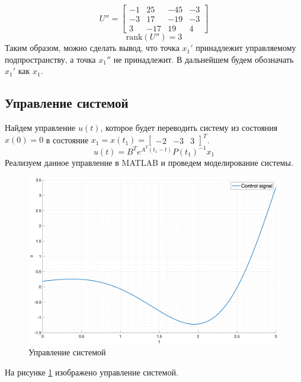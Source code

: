 \begin{equation}
   U'' = \begin{bmatrix}
        -1 & 25 & -45 & -3 \\
        -3 & 17 & -19 & -3 \\
        3 & -17 & 19 & 4
    \end{bmatrix}
\end{equation}
\begin{equation}
    \text{rank}(U'') = 3
\end{equation}
Таким образом, можно сделать вывод, что точка $x_1'$ принадлежит управляемому подпространству, а точка $x_1''$ не принадлежит. В дальнейшем будем обозначать $x_1'$ как $x_1$.

\subsection{Управление системой}
Найдем управление $u(t)$, которое будет переводить систему из состояния $x(0) = 0$ в состояние $x_1 = x(t_1) = \begin{bmatrix} -2 & -3 & 3 \end{bmatrix}^T$. 
\begin{equation}
    u(t) = B^Te^{A^T(t_1 - t)}P(t_1)^{-1}x_1
\end{equation}
Реализуем данное управление в MATLAB и проведем моделирование системы.  
\begin{figure}
    \centering
    \includegraphics[width=\textwidth]{media/plots/task2_control_signal.png}
    \caption{Управление системой}
    \label{fig:task2_control_signal}
\end{figure}
На рисунке \ref{fig:task2_control_signal} изображено управление системой.
